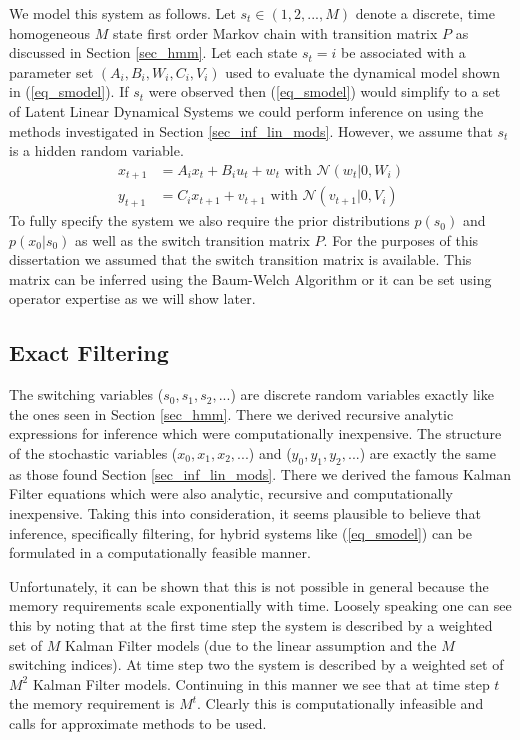 We model this system as follows. Let $s_t \in (1,2,..., M)$ denote a discrete, time homogeneous $M$ state first order Markov chain with transition matrix $P$ as discussed in Section \ref{sec_hmm}. Let each state $s_t=i$ be associated with a parameter set $\left(A_i, B_i, W_i, C_i, V_i \right)$ used to evaluate the dynamical model shown in (\ref{eq_smodel}). If $s_t$ were observed then (\ref{eq_smodel}) would simplify to a set of Latent Linear Dynamical Systems we could perform inference on using the methods investigated in Section \ref{sec_inf_lin_mods}. However, we assume that $s_t$ is a hidden random variable.
\begin{equation}
\begin{aligned}
x_{t+1} &= A_ix_t + B_iu_t + w_{t} \text{ with } \mathcal{N}(w_{t}|0,W_i) \\
y_{t+1} &= C_ix_{t+1} + v_{t+1}  \text{ with } \mathcal{N}(v_{t+1}|0,V_i)
\end{aligned}
\label{eq_smodel}
\end{equation}
To fully specify the system we also require the prior distributions $p(s_0)$ and $p(x_0|s_0)$ as well as the switch transition matrix $P$. For the purposes of this dissertation we assumed that the switch transition matrix is available. This matrix can be inferred using the Baum-Welch Algorithm or it can be set using operator expertise as we will show later.

\subsection{Exact Filtering}
The switching variables ($s_0, s_1, s_2,...$) are discrete random variables exactly like the ones seen in Section \ref{sec_hmm}. There we derived recursive analytic expressions for inference which were computationally inexpensive. The structure of the stochastic variables ($x_0, x_1,x_2,...$) and ($y_0,y_1, y_2,...$) are exactly the same as those found Section \ref{sec_inf_lin_mods}. There we derived the famous Kalman Filter equations which were also analytic, recursive and computationally inexpensive. Taking this into consideration, it seems plausible to believe that inference, specifically filtering, for hybrid systems like (\ref{eq_smodel}) can be formulated in a computationally feasible manner. 

Unfortunately, it can be shown that this is not possible in general \cite{lerner}\cite{murphy3} because the memory requirements scale exponentially with time. Loosely speaking one can see this by noting that at the first time step the system is described by a weighted set of $M$ Kalman Filter models (due to the linear assumption and the $M$ switching indices). At time step two the system is described by a weighted set of $M^2$ Kalman Filter models. Continuing in this manner we see that at time step $t$ the memory requirement is $M^t$. Clearly this is computationally infeasible and calls for approximate methods to be used. 

